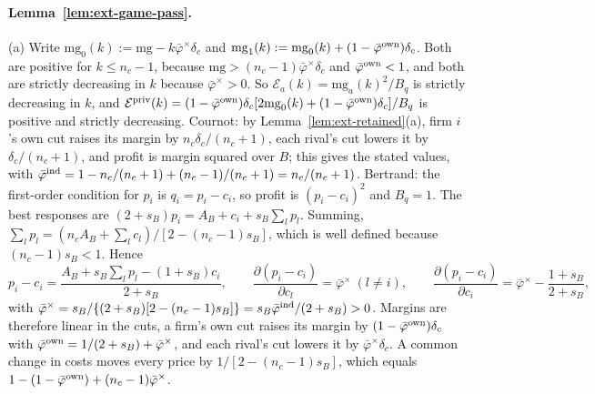 \paragraph{Lemma~\ref{lem:ext-game-pass}.} (a) Write $\mathrm{mg}_0(k):=\mathrm{mg}-k\bar\varphi^\times\delta_c$ and $\mathrm{mg}_1(k):=\mathrm{mg}_0(k)+(1-\bar\varphi^{\rm own})\delta_c$. Both are positive for $k\le n_c-1$, because $\mathrm{mg}>(n_c-1)\bar\varphi^\times\delta_c$ and $\bar\varphi^{\rm own}<1$, and both are strictly decreasing in $k$ because $\bar\varphi^\times>0$. So $\mathcal E_a(k)=\mathrm{mg}_a(k)^2/B_q$ is strictly decreasing in $k$, and $\mathcal E^{\rm priv}(k)=(1-\bar\varphi^{\rm own})\delta_c[2\mathrm{mg}_0(k)+(1-\bar\varphi^{\rm own})\delta_c]/B_q$ is positive and strictly decreasing. Cournot: by Lemma~\ref{lem:ext-retained}(a), firm $i$'s own cut raises its margin by $n_c\delta_c/(n_c+1)$, each rival's cut lowers it by $\delta_c/(n_c+1)$, and profit is margin squared over $B$; this gives the stated values, with $\bar\varphi^{\rm ind}=1-n_c/(n_c+1)+(n_c-1)/(n_c+1)=n_c/(n_c+1)$. Bertrand: the first-order condition for $p_i$ is $q_i=p_i-c_i$, so profit is $(p_i-c_i)^2$ and $B_q=1$. The best responses are $(2+s_B)p_i=A_B+c_i+s_B\sum_lp_l$. Summing, $\sum_lp_l=(n_cA_B+\sum_lc_l)/[2-(n_c-1)s_B]$, which is well defined because $(n_c-1)s_B<1$. Hence
\[
p_i-c_i=\frac{A_B+s_B\sum_lp_l-(1+s_B)c_i}{2+s_B},\qquad \frac{\partial(p_i-c_i)}{\partial c_l}=\bar\varphi^\times\ (l\ne i),\qquad \frac{\partial(p_i-c_i)}{\partial c_i}=\bar\varphi^\times-\frac{1+s_B}{2+s_B},
\]
with $\bar\varphi^\times=s_B/\{(2+s_B)[2-(n_c-1)s_B]\}=s_B\bar\varphi^{\rm ind}/(2+s_B)>0$. Margins are therefore linear in the cuts, a firm's own cut raises its margin by $(1-\bar\varphi^{\rm own})\delta_c$ with $\bar\varphi^{\rm own}=1/(2+s_B)+\bar\varphi^\times$, and each rival's cut lowers it by $\bar\varphi^\times\delta_c$. A common change in costs moves every price by $1/[2-(n_c-1)s_B]$, which equals $1-(1-\bar\varphi^{\rm own})+(n_c-1)\bar\varphi^\times$.

